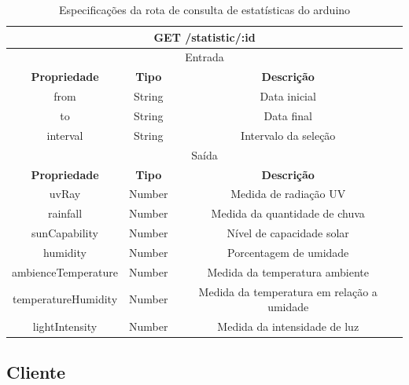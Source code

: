 \begin{table}[H]
    \centering
    \caption{Especificações da rota de consulta de estatísticas do arduino}
    \begin{tabular}{c|c|c}
    \hline
    \multicolumn{3}{c}{\textbf{GET /statistic/:id}} \\ \hline
    \multicolumn{3}{c}{Entrada}                                                \\ \hline
    \textbf{Propriedade}         & \textbf{Tipo}         & \textbf{Descrição}    \\  \hline
    from                         & String                & Data inicial    \\  \hline
    to                        & String                & Data final \\ \hline
    interval                        & String                & Intervalo da seleção \\ \hline

    \multicolumn{3}{c}{Saída}                                                \\ \hline
    \textbf{Propriedade}         & \textbf{Tipo}         & \textbf{Descrição}    \\  \hline
    uvRay                        & Number                & Medida de radiação UV \\
    \hline
    rainfall                     & Number                & Medida da quantidade de chuva \\ \hline
    sunCapability                     & Number                & Nível de capacidade solar \\ \hline
    humidity                     & Number                & Porcentagem de umidade \\ \hline
    ambienceTemperature                     & Number                & Medida da temperatura ambiente \\ \hline
    temperatureHumidity                     & Number                & Medida da temperatura em relação a umidade \\ \hline
    lightIntensity                     & Number                & Medida da intensidade de luz \\ \hline
    \hline
    \end{tabular}
\end{table}

\subsection{Cliente}
\label{sec:cliente}

